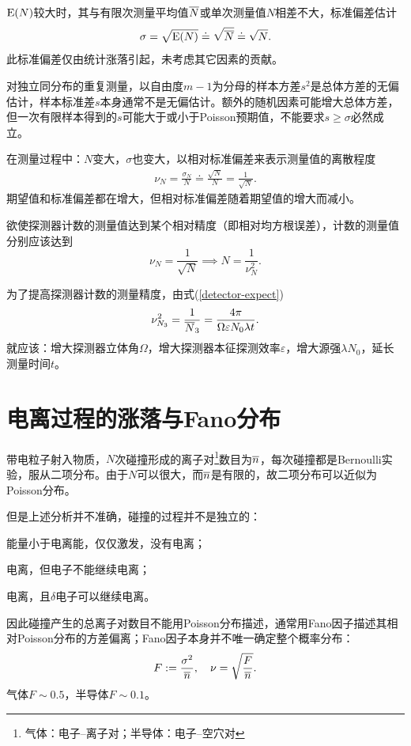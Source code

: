 $\operatorname{E}(N)$较大时，其与有限次测量平均值$\overline{N}$或单次测量值$N$相差不大，标准偏差估计
\begin{equation}\label{eq:nrd-poisson-count-uncertainty}
	\sigma = \sqrt{\operatorname{E}(N)} \doteq \sqrt{\overline{N}} \doteq \sqrt N.
\end{equation}
此标准偏差仅由统计涨落引起，未考虑其它因素的贡献。

对独立同分布的重复测量，以自由度$m - 1$为分母的样本方差$s^2$是总体方差的无偏估计，样本标准差$s$本身通常不是无偏估计。额外的随机因素可能增大总体方差，但一次有限样本得到的$s$可能大于或小于Poisson预期值，不能要求$s \geq \sigma$必然成立。

在测量过程中：$N$变大，$\sigma$也变大，以相对标准偏差来表示测量值的离散程度
\begin{align}
	\nu_N = \frac{\sigma_N}N \doteq \frac{\sqrt N}N = \frac1{\sqrt N}.
\end{align}
期望值和标准偏差都在增大，但相对标准偏差随着期望值的增大而减小。

欲使探测器计数的测量值达到某个相对精度（即相对均方根误差），计数的测量值分别应该达到
\begin{equation}\label{eq:nrd-required-counts}
	\nu_N = \frac1{\sqrt N} \implies N = \frac1{\nu_N^2}.
\end{equation}

为了提高探测器计数的测量精度，由式(\ref{detector-expect})
\[
	\nu_{N_3}^2 = \frac1{\overline{N}_3} = \frac{4\pi}{\Omega\varepsilon N_0\lambda t}.
\]
就应该：增大探测器立体角$\Omega$，增大探测器本征探测效率$\varepsilon$，增大源强$\lambda N_0$，延长测量时间$t$。

\section{电离过程的涨落与Fano分布}

带电粒子射入物质，$N$次碰撞形成的离子对\footnote{气体：电子--离子对；半导体：电子--空穴对}数目为$\overline{n}$，每次碰撞都是Bernoulli实验，服从二项分布。由于$N$可以很大，而$\overline{n}$是有限的，故二项分布可以近似为Poisson分布。

但是上述分析并不准确，碰撞的过程并不是独立的：
\begin{compactenum}
	\item 能量小于电离能，仅仅激发，没有电离；
	\item 电离，但电子不能继续电离；
	\item 电离，且$\delta$电子可以继续电离。
\end{compactenum}
因此碰撞产生的总离子对数目不能用Poisson分布描述，通常用Fano因子描述其相对Poisson分布的方差偏离；Fano因子本身并不唯一确定整个概率分布：
\begin{align}
	F := \frac{\sigma^2}{\overline{n}},\quad\nu = \sqrt{\frac F{\overline{n}}}.
\end{align}
气体$F \sim 0.5$，半导体$F \sim 0.1$。

